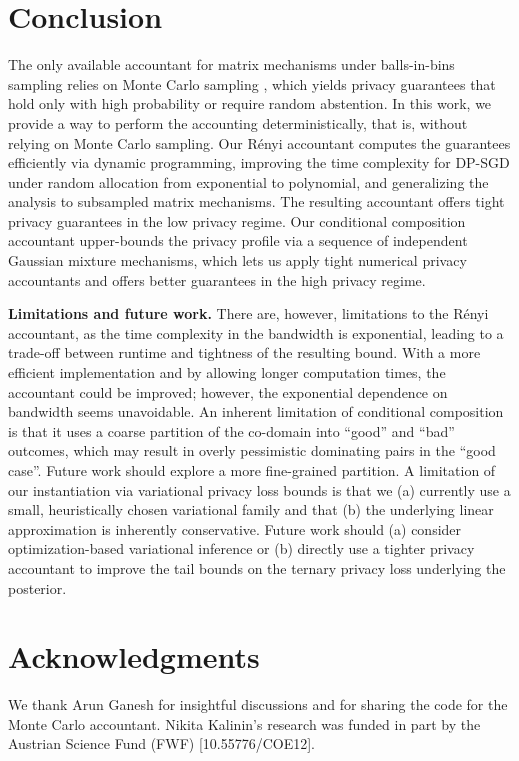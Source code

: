 \documentclass{article}
\theoremstyle{plain}
\theoremstyle{definition}
\theoremstyle{remark}
\begin{document}
\section{Conclusion}
The only available accountant for matrix mechanisms under balls-in-bins sampling relies on  Monte Carlo sampling \citep{choquette2024near}, which yields privacy guarantees that hold only with high probability or require random abstention. In this work, we provide a way to perform the accounting deterministically, that is, without relying on Monte Carlo sampling. Our Rényi  accountant computes the guarantees efficiently via dynamic programming, improving the time complexity for DP-SGD under random allocation \citep{feldman2025privacy} from exponential to polynomial, and generalizing the analysis to subsampled matrix mechanisms. The resulting accountant offers tight privacy guarantees in the low privacy regime.
Our conditional composition accountant upper-bounds the privacy profile via
a sequence of independent Gaussian mixture mechanisms, which lets us apply tight numerical privacy accountants and offers better guarantees in the high privacy regime.

\textbf{Limitations and future work.}
There are, however, limitations to the Rényi accountant, as the time complexity in the bandwidth is exponential, leading to a trade-off between runtime and tightness of the resulting bound. With a more efficient implementation and by allowing longer computation times, the accountant could be improved; however, the exponential dependence on bandwidth seems unavoidable.
An inherent limitation of conditional composition is that it uses a coarse partition of the co-domain into ``good'' and ``bad'' outcomes, which may result in overly pessimistic dominating pairs in the ``good case''. Future work should explore a more fine-grained partition. 
A limitation of our instantiation via variational privacy loss bounds is that
we (a) currently use a small, heuristically chosen variational family
and that (b) the underlying linear approximation is inherently conservative.
Future work should (a) consider optimization-based variational inference or
(b) directly use a tighter privacy accountant to improve the tail bounds
on the ternary privacy loss underlying the posterior.

\section*{Acknowledgments}
We thank Arun Ganesh for insightful discussions and for sharing the code for the Monte Carlo accountant.
Nikita Kalinin’s research was funded in part by the Austrian Science Fund (FWF) [10.55776/COE12].
\end{document}
